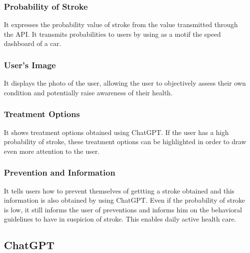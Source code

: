 \subsubsection{Probability of Stroke}
It expresses the probability value of stroke from the value transmitted through the API. It transmits probabilities to users by using as a motif the speed dashboard of a car.\\
\subsubsection{User's Image}
It displays the photo of the user, allowing the user to objectively assess their own condition and potentially raise awareness of their health.\\
\subsubsection{Treatment Options}
It shows treatment options obtained using ChatGPT. If the user has a high probability of stroke, these treatment options can be highlighted in order to draw even more attention to the user.\\
\subsubsection{Prevention and Information}
It tells users how to prevent themselves of gettting a stroke obtained and this information is also obtained by using ChatGPT. Even if the probability of stroke is low, it still informs the user of preventions and informs him on the behavioral guidelines to have in suspicion of stroke. This enables daily active health care.\\

\subsection{ChatGPT}

